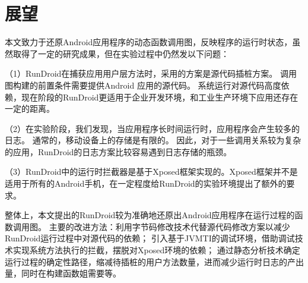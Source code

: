 
\section{展望}

本文致力于还原Android应用程序的动态函数调用图，反映程序的运行时状态，虽然取得了一定的研究成果，但在实验过程中仍然发以下问题：

（1）RunDroid在捕获应用用户层方法时，采用的方案是源代码插桩方案。
调用图构建的前置条件需要提供Android 应用的源代码。
系统运行对源代码高度依赖，现在阶段的RunDroid更适用于企业开发环境，和工业生产环境下应用还存在一定的距离。

（2）在实验阶段，我们发现，当应用程序长时间运行时，应用程序会产生较多的日志。
通常的，移动设备上的存储是有限的。
因此，对于一些调用关系较为复杂的应用，RunDroid的日志方案比较容易遇到日志存储的瓶颈。

（3）RunDroid中的运行时拦截器是基于Xposed框架实现的。Xposed框架并不是适用于所有的Android手机，在一定程度给RunDroid的实验环境提出了额外的要求。

整体上，本文提出的RunDroid较为准确地还原出Android应用程序在运行过程的函数调用图。
主要的改进方法：利用字节码修改技术代替源代码修改方案以减少RunDroid运行过程中对源代码的依赖；
引入基于JVMTI的调试环境，借助调试技术实现系统方法执行的拦截，摆脱对Xposed环境的依赖；
通过静态分析技术确定运行过程的确定性路径，缩减待插桩的用户方法数量，进而减少运行时日志的产出量，同时在构建函数姐需要等。